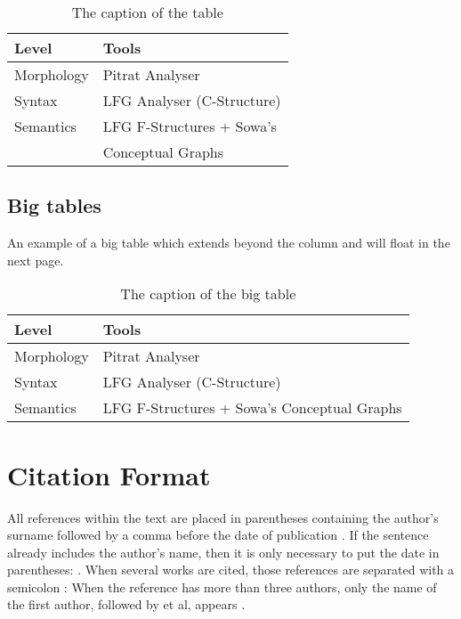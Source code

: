 \documentclass[10pt, a4paper]{article}
\begin{document}
\begin{table}[h]
 \begin{center}
\begin{tabular}{|l|l|}

      \hline
      Level&Tools\\
      \hline\hline
      Morphology & Pitrat Analyser\\
      Syntax & LFG Analyser (C-Structure)\\
      Semantics & LFG F-Structures + Sowa's\\
      & Conceptual Graphs\\
      \hline

\end{tabular}
\caption{The caption of the table}
 \end{center}
\end{table}


\subsection{Big tables}

An example of a big table which extends beyond the column and will
float in the next page.

 \begin{table*}[ht]
 \begin{center}
 \begin{tabular}{|l|l|}

       \hline
       Level&Tools\\
       \hline\hline
       Morphology & Pitrat Analyser\\
       Syntax & LFG Analyser (C-Structure)\\
       Semantics & LFG F-Structures + Sowa's Conceptual Graphs  \\
       \hline

 \end{tabular}
 \caption{The caption of the big table}
 \end{center}
 \end{table*}


\section{Citation Format}

All references within the text are placed in parentheses containing the author's surname followed by a comma before the date of publication \cite{chomsky-73}. If the sentence already includes the author's name, then it is only necessary to put the date in parentheses:  . When several works are cited, those references are separated with a semicolon \cite{chomsky-73,feigl-58}:  When the reference has more than three authors, only the name of the first author, followed by et al,  appears \cite{fletcher-hopkins}.
\end{document}
